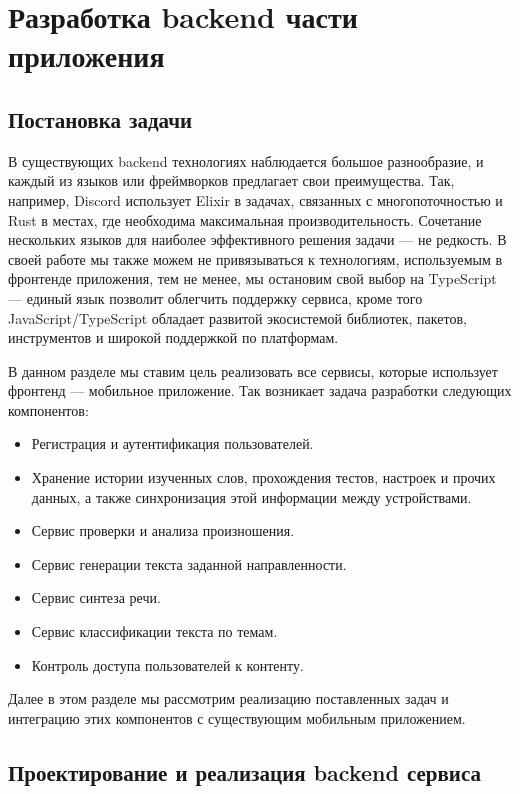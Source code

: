 \section{Разработка backend части приложения}

\subsection{Постановка задачи}
В существующих backend технологиях наблюдается большое разнообразие, и каждый из языков или фреймворков предлагает свои преимущества. Так, например, Discord использует Elixir в задачах, связанных с многопоточностью\cite{discord-elixir} и Rust в местах, где необходима максимальная производительность\cite{discord-rust}. Сочетание нескольких языков для наиболее эффективного решения задачи --- не редкость. В своей работе мы также можем не привязываться к технологиям, используемым в фронтенде приложения, тем не менее, мы остановим свой выбор на TypeScript --- единый язык позволит облегчить поддержку сервиса, кроме того JavaScript/Type\-Script обладает развитой экосистемой библиотек, пакетов, инструментов и широкой поддержкой по платформам.

В данном разделе мы ставим цель реализовать все сервисы, которые использует фронтенд --- мобильное приложение. Так возникает задача разработки следующих компонентов:
\begin{itemize}
	\item Регистрация и аутентификация пользователей.
	\item Хранение истории изученных слов, прохождения тестов, настроек и прочих данных, а также синхронизация этой информации между устройствами.
	\item Сервис проверки и анализа произношения.
	\item Сервис генерации текста заданной направленности.
	\item Сервис синтеза речи.
	\item Сервис классификации текста по темам.
	\item Контроль доступа пользователей к контенту.
\end{itemize}

Далее в этом разделе мы рассмотрим реализацию поставленных задач и интеграцию этих компонентов с существующим мобильным приложением.

\subsection{Проектирование и реализация backend сервиса}
